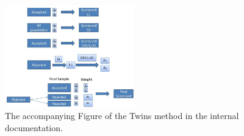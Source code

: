 \begin{figure}
\centering
\includegraphics[width=0.5\textwidth]{figures/appendix/processusTwins.png}
\caption{The accompanying Figure of the Twins method in the internal documentation.}
\label{fig:twins}
\end{figure}

